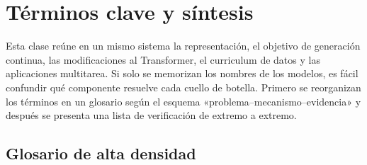 \section{Términos clave y síntesis}

Esta clase reúne en un mismo sistema la representación, el objetivo de generación continua, las modificaciones al Transformer, el curriculum de datos y las aplicaciones multitarea. Si solo se memorizan los nombres de los modelos, es fácil confundir qué componente resuelve cada cuello de botella. Primero se reorganizan los términos en un glosario según el esquema «problema--mecanismo--evidencia» y después se presenta una lista de verificación de extremo a extremo.

\subsection{Glosario de alta densidad}

